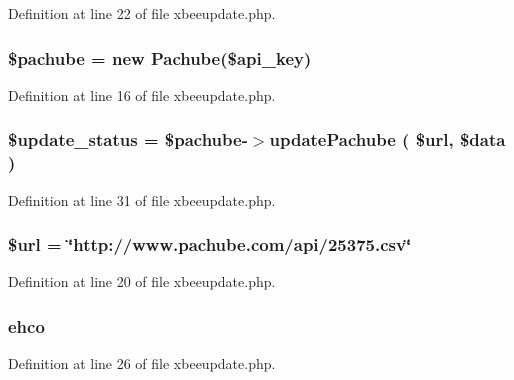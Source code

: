 Definition at line 22 of file xbeeupdate.\+php.

\subsubsection[{\texorpdfstring{\$pachube}{$pachube}}]{\setlength{\rightskip}{0pt plus 5cm}\$pachube = new {\bf Pachube}(\$api\+\_\+key)}\hypertarget{xbeeupdate_8php_a9adc98bad34c320e13c5844ae09f3898}{}\label{xbeeupdate_8php_a9adc98bad34c320e13c5844ae09f3898}


Definition at line 16 of file xbeeupdate.\+php.

\subsubsection[{\texorpdfstring{\$update\+\_\+status}{$update_status}}]{\setlength{\rightskip}{0pt plus 5cm}\$update\+\_\+status = \$pachube-\/$>$update\+Pachube ( \$url, \$data )}\hypertarget{xbeeupdate_8php_ae9e1411ff46e859a40f8f1a7646430cf}{}\label{xbeeupdate_8php_ae9e1411ff46e859a40f8f1a7646430cf}


Definition at line 31 of file xbeeupdate.\+php.

\subsubsection[{\texorpdfstring{\$url}{$url}}]{\setlength{\rightskip}{0pt plus 5cm}\$url = \char`\"{}http\+://www.\+pachube.\+com/api/25375.csv\char`\"{}}\hypertarget{xbeeupdate_8php_acf215f34a917d014776ce684a9ee8909}{}\label{xbeeupdate_8php_acf215f34a917d014776ce684a9ee8909}


Definition at line 20 of file xbeeupdate.\+php.

\subsubsection[{\texorpdfstring{ehco}{ehco}}]{\setlength{\rightskip}{0pt plus 5cm}ehco}\hypertarget{xbeeupdate_8php_ab72c8e045a13ad42d78ba1dc5f5f8389}{}\label{xbeeupdate_8php_ab72c8e045a13ad42d78ba1dc5f5f8389}


Definition at line 26 of file xbeeupdate.\+php.

